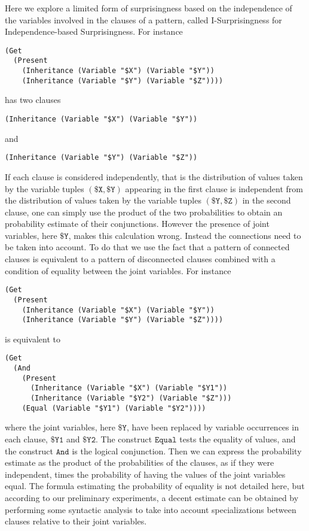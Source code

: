 \documentclass[runningheads]{llncs}
\begin{document}
Here we explore a limited form of surprisingness based on the
independence of the variables involved in the clauses of a pattern,
called I-Surprisingness for Independence-based Surprisingness. For
instance
\begin{verbatim}
(Get
  (Present
    (Inheritance (Variable "$X") (Variable "$Y"))
    (Inheritance (Variable "$Y") (Variable "$Z"))))
\end{verbatim}
has two clauses
\begin{verbatim}
(Inheritance (Variable "$X") (Variable "$Y"))
\end{verbatim}
and
\begin{verbatim}
(Inheritance (Variable "$Y") (Variable "$Z"))
\end{verbatim}
If each clause is considered independently, that is the distribution
of values taken by the variable tuples $(\texttt{\$X}, \texttt{\$Y})$
appearing in the first clause is independent from the distribution of
values taken by the variable tuples $(\texttt{\$Y}, \texttt{\$Z})$ in
the second clause, one can simply use the product of the two
probabilities to obtain an probability estimate of their
conjunctions. However the presence of joint variables, here
$\texttt{\$Y}$, makes this calculation wrong. Instead the connections
need to be taken into account. To do that we use the fact that a
pattern of connected clauses is equivalent to a pattern of
disconnected clauses combined with a condition of equality between the
joint variables. For instance
\begin{verbatim}
(Get
  (Present
    (Inheritance (Variable "$X") (Variable "$Y"))
    (Inheritance (Variable "$Y") (Variable "$Z"))))
\end{verbatim}
is equivalent to
\begin{verbatim}
(Get
  (And
    (Present
      (Inheritance (Variable "$X") (Variable "$Y1"))
      (Inheritance (Variable "$Y2") (Variable "$Z")))
    (Equal (Variable "$Y1") (Variable "$Y2"))))
\end{verbatim}
where the joint variables, here $\texttt{\$Y}$, have been replaced by
variable occurrences in each clause, $\texttt{\$Y1}$ and
$\texttt{\$Y2}$. The construct $\texttt{Equal}$ tests the equality of
values, and the construct $\texttt{And}$ is the logical
conjunction.
Then we can express the probability estimate as the product of the
probabilities of the clauses, as if they were independent, times the
probability of having the values of the joint variables equal. The
formula estimating the probability of equality is not detailed here,
but according to our preliminary experiments, a decent estimate can be
obtained by performing some syntactic analysis to take into account
specializations between clauses relative to their joint variables.
\end{document}
